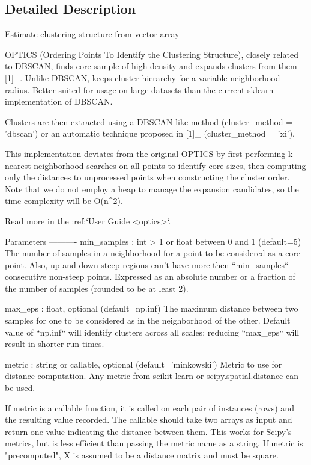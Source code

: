 \subsection{Detailed Description}
\begin{DoxyVerb}Estimate clustering structure from vector array

OPTICS (Ordering Points To Identify the Clustering Structure), closely
related to DBSCAN, finds core sample of high density and expands clusters
from them [1]_. Unlike DBSCAN, keeps cluster hierarchy for a variable
neighborhood radius. Better suited for usage on large datasets than the
current sklearn implementation of DBSCAN.

Clusters are then extracted using a DBSCAN-like method
(cluster_method = 'dbscan') or an automatic
technique proposed in [1]_ (cluster_method = 'xi').

This implementation deviates from the original OPTICS by first performing
k-nearest-neighborhood searches on all points to identify core sizes, then
computing only the distances to unprocessed points when constructing the
cluster order. Note that we do not employ a heap to manage the expansion
candidates, so the time complexity will be O(n^2).

Read more in the :ref:`User Guide <optics>`.

Parameters
----------
min_samples : int > 1 or float between 0 and 1 (default=5)
    The number of samples in a neighborhood for a point to be considered as
    a core point. Also, up and down steep regions can't have more then
    ``min_samples`` consecutive non-steep points. Expressed as an absolute
    number or a fraction of the number of samples (rounded to be at least
    2).

max_eps : float, optional (default=np.inf)
    The maximum distance between two samples for one to be considered as
    in the neighborhood of the other. Default value of ``np.inf`` will
    identify clusters across all scales; reducing ``max_eps`` will result
    in shorter run times.

metric : string or callable, optional (default='minkowski')
    Metric to use for distance computation. Any metric from scikit-learn
    or scipy.spatial.distance can be used.

    If metric is a callable function, it is called on each
    pair of instances (rows) and the resulting value recorded. The callable
    should take two arrays as input and return one value indicating the
    distance between them. This works for Scipy's metrics, but is less
    efficient than passing the metric name as a string. If metric is
    "precomputed", X is assumed to be a distance matrix and must be square.


\end{DoxyVerb}
